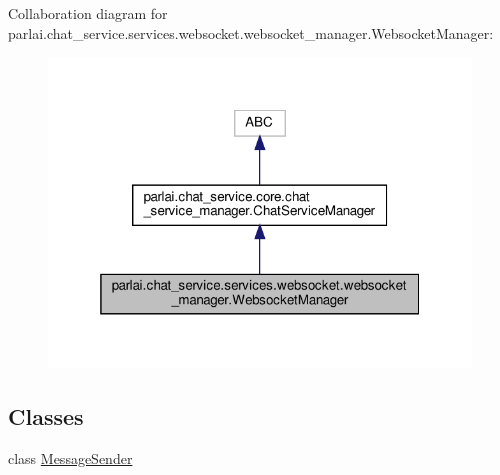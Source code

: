 Collaboration diagram for parlai.\+chat\+\_\+service.\+services.\+websocket.\+websocket\+\_\+manager.\+Websocket\+Manager\+:
\nopagebreak
\begin{figure}[H]
\begin{center}
\leavevmode
\includegraphics[width=319pt]{d6/d77/classparlai_1_1chat__service_1_1services_1_1websocket_1_1websocket__manager_1_1WebsocketManager__coll__graph}
\end{center}
\end{figure}
\subsection*{Classes}
\begin{DoxyCompactItemize}
\item 
class \hyperlink{classparlai_1_1chat__service_1_1services_1_1websocket_1_1websocket__manager_1_1WebsocketManager_1_1MessageSender}{Message\+Sender}
\end{DoxyCompactItemize}
